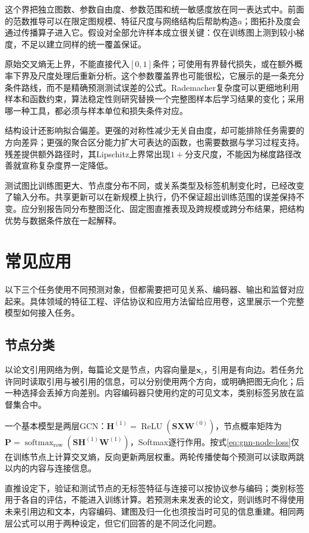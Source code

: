 这个界把独立图数、参数自由度、参数范围和统一敏感度放在同一表达式中。前面的范数推导可以在限定图规模、特征尺度与网络结构后帮助构造$a$；图拓扑及度会通过传播算子进入它。假设对全部允许样本成立很关键：仅在训练图上测到较小梯度，不足以建立同样的统一覆盖保证。

原始交叉熵无上界，不能直接代入$[0,1]$条件；可使用有界替代损失，或在额外概率下界及尺度处理后重新分析。这个参数覆盖界也可能很松，它展示的是一条充分条件路线，而不是精确预测测试误差的公式。Rademacher复杂度可以更细地利用样本和函数约束，算法稳定性则研究替换一个完整图样本后学习结果的变化；采用哪一种工具，都必须与样本单位和损失条件对应。

结构设计还影响拟合偏差。更强的对称性减少无关自由度，却可能排除任务需要的方向差异；更强的聚合区分能力扩大可表达的函数，也需要数据与学习过程支持。残差提供额外路径时，其Lipschitz上界常出现$1+$分支尺度，不能因为梯度路径改善就宣称复杂度界一定降低。

测试图比训练图更大、节点度分布不同，或关系类型及标签机制变化时，已经改变了输入分布。共享更新可以在新规模上执行，仍不保证超出训练范围的误差保持不变。应分别报告同分布整图泛化、固定图直推表现及跨规模或跨分布结果，把结构优势与数据条件放在一起解释。

\section{常见应用}
\label{sec:gnn-applications}

以下三个任务使用不同预测对象，但都需要把可见关系、编码器、输出和监督对应起来。具体领域的特征工程、评估协议和应用方法留给应用卷，这里展示一个完整模型如何接入任务。

\subsection{节点分类}
\label{sec:gnn-application-node}

以论文引用网络为例，每篇论文是节点，内容向量是$\bm{x}_i$，引用是有向边。若任务允许同时读取引用与被引用的信息，可以分别使用两个方向，或明确把图无向化；后一种选择会丢掉方向差别。内容编码器只使用约定的可见文本，类别标签另放在监督集合中。

一个基本模型是两层GCN：$\bm{H}^{(1)}=\operatorname{ReLU}(\bm{S}\bm{X}\bm{W}^{(0)})$，节点概率矩阵为$\bm{P}=\operatorname{softmax}_{\mathrm{row}}(\bm{S}\bm{H}^{(1)}\bm{W}^{(1)})$，Softmax逐行作用。按式\eqref{eq:gnn-node-loss}仅在训练节点上计算交叉熵，反向更新两层权重。两轮传播使每个预测可以读取两跳以内的内容与连接信息。

直推设定下，验证和测试节点的无标签特征与连接可以按协议参与编码；类别标签用于各自的评估，不能进入训练计算。若预测未来发表的论文，则训练时不得使用未来引用边和文本，内容编码、建图及归一化也须按当时可见的信息重建。相同两层公式可以用于两种设定，但它们回答的是不同泛化问题。


